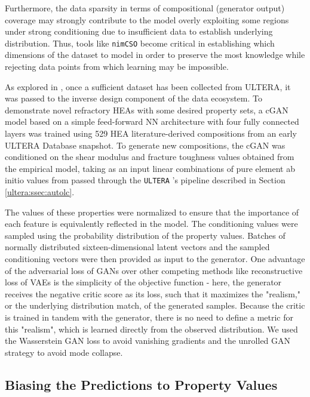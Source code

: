 Furthermore, the data sparsity in terms of compositional (generator output) coverage may strongly contribute to the model overly exploiting some regions under strong conditioning due to insufficient data to establish underlying distribution. Thus, tools like \texttt{nimCSO} become critical in establishing which dimensions of the dataset to model in order to preserve the most knowledge while rejecting data points from which learning may be impossible.

As explored in \citet{Debnath2021GenerativeAlloys}, once a sufficient dataset has been collected from ULTERA, it was passed to the inverse design component of the data ecosystem. To demonstrate novel refractory HEAs with some desired property sets, a cGAN model based on a simple feed-forward NN architecture with four fully connected layers was trained using 529 HEA literature-derived compositions from an early ULTERA Database snapshot. To generate new compositions, the cGAN was conditioned on the shear modulus and fracture toughness values obtained from the empirical model, taking as an input linear combinations of pure element ab initio values from \citet{Chong2021CorrelationAlloys} passed through the \texttt{ULTERA} 's pipeline described in Section \ref{ultera:ssec:autolc}.

The values of these properties were normalized to ensure that the importance of each feature is equivalently reflected in the model. The conditioning values were sampled using the probability distribution of the property values. Batches of normally distributed sixteen-dimensional latent vectors and the sampled conditioning vectors were then provided as input to the generator. One advantage of the adversarial loss of GANs over other competing methods like reconstructive loss of VAEs is the simplicity of the objective function - here, the generator receives the negative critic score as its loss, such that it maximizes the "realism," or the underlying distribution match, of the generated samples. Because the critic is trained in tandem with the generator, there is no need to define a metric for this "realism", which is learned directly from the observed distribution. We used the Wasserstein GAN \cite{Arjovsky2017WassersteinNetworks} loss to avoid vanishing gradients and the unrolled GAN \cite{Metz2016UnrolledNetworks} strategy to avoid mode collapse.

\subsection{Biasing the Predictions to Property Values} \label{inverse:ssec:propbias}

